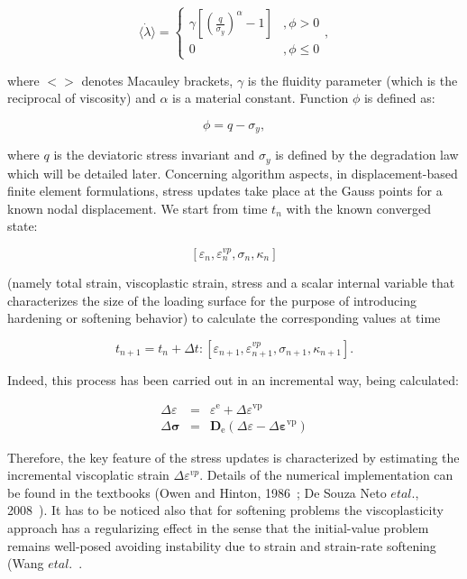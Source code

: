\documentclass[applsci,journal,article,submit,moreauthors,pdftex]{Definitions/mdpi}
\begin{document}
\begin{equation}
\langle \dot{\lambda}\rangle=\left\{\begin{array}{cl}\gamma\left[\left(\frac{q}{\sigma_y}\right)^\alpha-1\right] & , \phi>0 \\ 0 & , \phi \leq 0\end{array}\right. ,
\end{equation}


where $<>$ denotes Macauley brackets, $\gamma$ is the fluidity parameter (which is the reciprocal of viscosity) and $\alpha$ is a material constant. Function $\phi$ is defined as:

\begin{equation}
\phi=q-\sigma_y,
\end{equation}

where $q$ is the deviatoric stress invariant and $\sigma_y$ is defined by the degradation law which will be detailed later. Concerning algorithm aspects, in displacement-based finite element formulations, stress updates take place at the Gauss points for a known nodal displacement. We start from time $t_{n}$ with the known converged state: 

\begin{equation}
\left[\varepsilon_{n}, \varepsilon_{n}^{v p}, \sigma_{n}, \kappa_{n}\right]
\end{equation}

(namely total strain, viscoplastic strain, stress and a scalar internal variable that characterizes the size of the loading surface for the purpose of introducing hardening or softening behavior) to calculate the corresponding values at time 

\begin{equation}
t_{n+1}=t_{n}+\Delta t:\left[\varepsilon_{n+1}, \varepsilon_{n+1}^{v p}, \sigma_{n+1}, \kappa_{n+1}\right].
\end{equation}

Indeed, this process has been carried out in an incremental way, being calculated:

\begin{eqnarray}
\Delta \varepsilon &=& \varepsilon^{\mathrm{e}}+\Delta \varepsilon^{\mathrm{vp}} \\
\Delta \boldsymbol{\sigma} &=& \mathbf{D}_{\mathrm{e}}\left(\Delta \varepsilon-\Delta \boldsymbol{\varepsilon}^{\mathrm{vp}}\right)
\end{eqnarray}


Therefore, the key feature of the stress updates is characterized by estimating the incremental viscoplatic strain $\Delta \varepsilon^{v p}.$ Details of the numerical implementation can be found in the textbooks (Owen and Hinton, 1986~\cite{Owen1981}; De Souza Neto $et al.$, 2008~\cite{DPOwen2005}). It has to be noticed also that for softening problems the viscoplasticity approach has a regularizing effect in the sense that the initial-value problem remains well-posed avoiding instability due to strain and strain-rate softening (Wang $et al.$~\cite{Wang:1997}.
\end{document}
